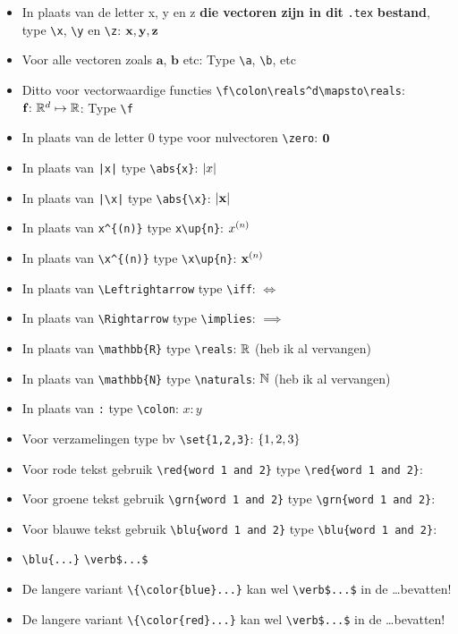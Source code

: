 \documentclass{2wa40summary}
\begin{document}
		\begin{itemize}
			\item In plaats van de letter x, y en z \textbf{die vectoren zijn in dit} \verb$.tex$ \textbf{bestand}, type
			\verb$\x$, \verb$\y$ en \verb$\z$: ${\textbf{x}}, {\textbf{y}}, {\textbf{z}}$
			\item Voor alle vectoren zoals $\mathbf{a}$, $\mathbf{b}$ etc: Type \verb$\a$, \verb$\b$, etc
			\item Ditto voor vectorwaardige functies \verb$\f\colon\reals^d\mapsto\reals$: ${\textbf{f}}\colon\mathbb{R}^d\mapsto\mathbb{R}$: Type \verb$\f$
			\item In plaats van de letter 0 type voor nulvectoren \verb$\zero$: ${\textbf{0}}$
			\item In plaats van \verb$|x|$ type \verb$\abs{x}$: ${\left|x\right|}$
			\item In plaats van \verb$|\x|$ type \verb$\abs{\x}$: ${\left|{\textbf{x}}\right|}$
			\item In plaats van \verb$x^{(n)}$ type \verb$x\up{n}$: $x^{(n)}$
			\item In plaats van \verb$\x^{(n)}$ type \verb$\x\up{n}$: ${\textbf{x}}^{(n)}$
			\item In plaats van \verb$\Leftrightarrow$ type \verb$\iff$: $\iff$
			\item In plaats van \verb$\Rightarrow$ type \verb$\implies$: $\implies$
			\item In plaats van \verb$\mathbb{R}$ type \verb$\reals$: $\mathbb{R}$ (heb ik al vervangen)
			\item In plaats van \verb$\mathbb{N}$ type \verb$\naturals$: $\mathbb{N}$ (heb ik al vervangen)
			\item In plaats van \verb$:$ type \verb$\colon$: $x\colon y$
			\item Voor verzamelingen type bv \verb$\set{1,2,3}$: $\lbrace1,2,3\rbrace$
			\item Voor rode tekst gebruik \verb$$ type \verb$\red{word 1 and 2}$: \red{word 1 and 2}
			\item Voor groene tekst gebruik \verb$$ type \verb$\grn{word 1 and 2}$: \grn{word 1 and 2}
			\item Voor blauwe tekst gebruik \verb$$ type \verb$\blu{word 1 and 2}$: \blu{word 1 and 2}
			\item {} \verb$\blu{...}$  \verb#\verb$...$# 
			\item De langere variant \verb$\{\color{blue}...}$ kan wel \verb#\verb$...$# in de \dots bevatten!
			\item De langere variant \verb$\{\color{red}...}$ kan wel \verb#\verb$...$# in de \dots bevatten!

\end{itemize}
\end{document}
